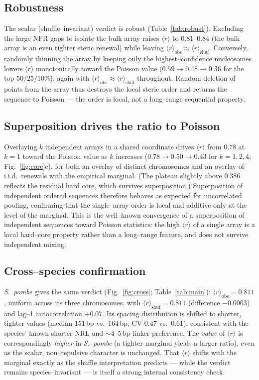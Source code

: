 \documentclass[11pt]{article}
\renewcommand{\r}{\langle r\rangle}
\begin{document}
\subsection{Robustness}

The scalar (shuffle--invariant) verdict is robust (Table~\ref{tab:robust}).
Excluding the large NFR gaps to isolate the bulk array raises $\r$ to
$0.81$--$0.84$ (the bulk array is an even tighter steric renewal) while leaving
$\r_{\mathrm{obs}}\approx\r_{\mathrm{shuf}}$. Conversely, randomly thinning the
array by keeping only the highest--confidence nucleosomes lowers $\r$
monotonically toward the Poisson value ($0.59\to0.48\to0.36$ for the top
$50/25/10\%$), again with $\r_{\mathrm{obs}}\approx\r_{\mathrm{shuf}}$
throughout. Random deletion of points from the array thus destroys the local
steric order and returns the sequence to Poisson --- the order is local, not a
long--range sequential property.

\subsection{Superposition drives the ratio to Poisson}

Overlaying $k$ independent arrays in a shared coordinate drives $\r$ from
$0.78$ at $k=1$ toward the Poisson value as $k$ increases
($0.78\to0.50\to0.43$ for $k=1,2,4$; Fig.~\ref{fig:core}c), for both an overlay
of distinct chromosomes and an overlay of i.i.d.\ renewals with the empirical
marginal. (The plateau slightly above $0.386$ reflects the residual hard core,
which survives superposition.) Superposition of independent ordered sequences
therefore behaves as expected for uncorrelated pooling, confirming that the
single--array order is local and additive only at the level of the marginal.
This is the well--known convergence of a superposition of independent sequences
toward Poisson statistics: the high $\r$ of a single array is a local hard--core
property rather than a long--range feature, and does not survive independent
mixing.

\subsection{Cross--species confirmation}

\textit{S.\ pombe} gives the same verdict (Fig.~\ref{fig:cross};
Table~\ref{tab:main}): $\r_{\mathrm{obs}}=0.811$, uniform across its three
chromosomes, with $\r_{\mathrm{shuf}}=0.811$ (difference $-0.0003$) and lag--1
autocorrelation $+0.07$. Its spacing distribution is shifted to shorter, tighter
values (median $151$\,bp vs.\ $164$\,bp; CV $0.47$ vs.\ $0.61$), consistent with
the species' known shorter NRL and $\sim$4--5\,bp linker preference. The
\emph{value} of $\r$ is correspondingly \emph{higher} in \textit{S.\ pombe}
(a tighter marginal yields a larger ratio), even as the scalar, non--repulsive
character is unchanged. That $\r$ shifts with the marginal exactly as the
shuffle interpretation predicts --- while the verdict remains species--invariant
--- is itself a strong internal consistency check.
\end{document}
